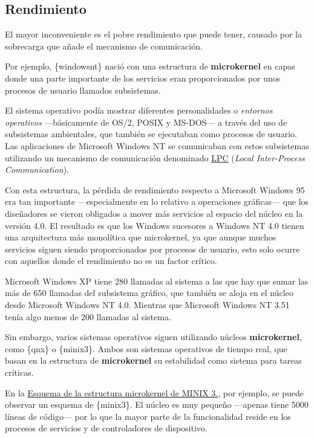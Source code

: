 \subsection{Rendimiento}\label{_rendimiento}

El mayor inconveniente es el pobre rendimiento que puede tener, causado
por la sobrecarga que añade el mecanismo de comunicación.

Por ejemplo, \{windowsnt\} nació con una estructura de
\textbf{microkernel} en capas donde una parte importante de los
servicios eran proporcionados por unos procesos de usuario llamados
subsistemas.

El sistema operativo podía mostrar diferentes personalidades o
\emph{entornos operativos} ---básicamente de OS/2, POSIX y MS-DOS--- a
través del uso de subsistemas ambientales, que también se ejecutaban
como procesos de usuario. Las aplicaciones de Microsoft Windows NT se
comunicaban con estos subsistemas utilizando un mecanismo de
comunicación denominado
\href{https://en.wikipedia.org/wiki/Local_Inter-Process_Communication}{LPC}
(\emph{Local Inter-Process Communication}).

Con esta estructura, la pérdida de rendimiento respecto a Microsoft
Windows 95 era tan importante ---especialmente en lo relativo a
operaciones gráficas--- que los diseñadores se vieron obligados a mover
más servicios al espacio del núcleo en la versión 4.0. El resultado es
que los Windows sucesores a Windows NT 4.0 tienen una arquitectura más
monolítica que microkernel, ya que aunque muchos servicios siguen siendo
proporcionados por procesos de usuario, esto solo ocurre con aquellos
donde el rendimiento no es un factor crítico.

Microsoft Windows XP tiene 280 llamadas al sistema a las que hay que
sumar las más de 650 llamadas del subsistema gráfico, que también se
aloja en el núcleo desde Microsoft Windows NT 4.0. Mientras que
Microsoft Windows NT 3.51 tenía algo menos de 200 llamadas al sistema.

Sin embargo, varios sistemas operativos siguen utilizando núcleos
\textbf{microkernel}, como \{qnx\} o \{minix3\}. Ambos son sistemas
operativos de tiempo real, que basan en la estructura de
\textbf{microkernel} su estabilidad como sistema para tareas críticas.

En la \hyperref[fig-estructura-minix3]{Esquema de la estructura
microkernel de MINIX 3.}, por ejemplo, se puede observar un esquema de
\{minix3\}. El núcleo es muy pequeño ---apenas tiene 5000 líneas de
código--- por lo que la mayor parte de la funcionalidad reside en los
procesos de servicios y de controladores de dispositivo.

